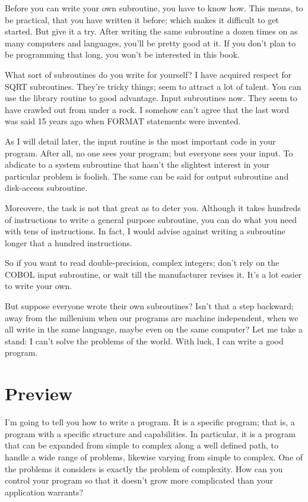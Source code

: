 \documentclass[b5paper, oneside]{book}
\begin{document}
Before you can write your own subroutine, you have to know how. This means, to be practical, that you have written it before; which makes it difficult to get started. But give it a try. After writing the same subroutine a dozen times on as many computers and languages, you'll be pretty good at it. If you don't plan to be programming that long, you won't be interested in this book.

What sort of subroutines do you write for yourself? I have acquired respect for SQRT subroutines. They're tricky things; seem to attract a lot of talent. You can use the library routine to good advantage. Input subroutines now. They seem to have crawled out from under a rock. I somehow can't agree that the last word was said 15 years ago when FORMAT statements were invented.

As I will detail later, the input routine is the most important code in your program. After all, no one sees your program; but everyone sees your input. To abdicate to a system subroutine that hasn't the slightest interest in your particular problem is foolish. The same can be said for output subroutine and disk-access subroutine.

Moreovere, the task is not that great as to deter you. Although it takes hundreds of instructions to write a general purpose subroutine, you can do what you need with tens of instructions. In fact, I would advise against writing a subroutine longer that a hundred instructions.

So if you want to read double-precision, complex integers; don't rely on the COBOL input subroutine, or wait till the manufacturer revises it. It's a lot easier to write your own.

But suppose everyone wrote their own subroutines? Isn't that a step backward; away from the millenium when our programs are machine independent, when we all write in the same language, maybe even on the same computer? Let me take a stand: I can't solve the problems of the world. With luck, I can write a good program.

\section{Preview}
I'm going to tell you how to write a program. It is a specific program; that is, a program with a specific structure and capabilities. In particular, it is a program that can be expanded from simple to complex along a well defined path, to handle a wide range of problems, likewise varying from simple to complex. One of the problems it considers is exactly the problem of complexity. How can you control your program so that it doesn't grow more complicated than your application warrants?
\end{document}
